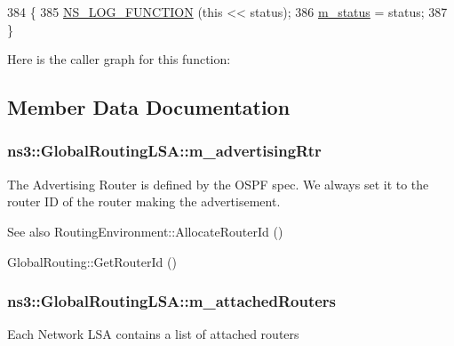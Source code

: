 \begin{DoxyCode}
384 \{
385   \hyperlink{log-macros-disabled_8h_a90b90d5bad1f39cb1b64923ea94c0761}{NS\_LOG\_FUNCTION} (\textcolor{keyword}{this} << status);
386   \hyperlink{classns3_1_1GlobalRoutingLSA_a9b3e65ddc724b95ddd7f4aae75d7518b}{m\_status} = status;
387 \}
\end{DoxyCode}


Here is the caller graph for this function\+:




\subsection{Member Data Documentation}
\subsubsection[{\texorpdfstring{m\+\_\+advertising\+Rtr}{m_advertisingRtr}}]{ ns3\+::\+Global\+Routing\+L\+S\+A\+::m\+\_\+advertising\+Rtr\hspace{0.3cm}{\ttfamily [private]}}\hypertarget{classns3_1_1GlobalRoutingLSA_a8eeb49a0e1c50afed4c016caa8f1c582}{}\label{classns3_1_1GlobalRoutingLSA_a8eeb49a0e1c50afed4c016caa8f1c582}
The Advertising Router is defined by the O\+S\+PF spec. We always set it to the router ID of the router making the advertisement.

\begin{DoxySeeAlso}{See also}
Routing\+Environment\+::\+Allocate\+Router\+Id () 

Global\+Routing\+::\+Get\+Router\+Id () 
\end{DoxySeeAlso}
\subsubsection[{\texorpdfstring{m\+\_\+attached\+Routers}{m_attachedRouters}}]{ ns3\+::\+Global\+Routing\+L\+S\+A\+::m\+\_\+attached\+Routers\hspace{0.3cm}{\ttfamily [private]}}\hypertarget{classns3_1_1GlobalRoutingLSA_aa7b5e6e43ade3f813a12c47e4420b3eb}{}\label{classns3_1_1GlobalRoutingLSA_aa7b5e6e43ade3f813a12c47e4420b3eb}
Each Network L\+SA contains a list of attached routers

